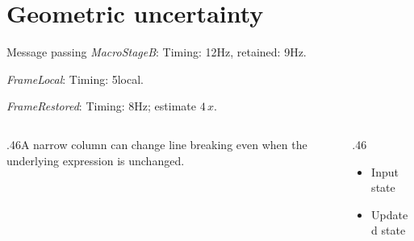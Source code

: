 \documentclass[11pt,aspectratio=43]{beamer}
\newcommand{\fuzzlayerA}[1]{\textit{#1}}
\newcommand{\fuzzlayerB}[1]{\fuzzlayerA{#1}}
\newcommand{\fuzzterm}[1]{\fuzzlayerB{#1}}
\newcommand{\fuzzpair}[2]{\fuzzterm{#1}: #2}
\newcommand{\fuzzunit}{Hz}
\let\fuzzoriginalunit\fuzzunit
\newcommand{\fuzzcoefficient}{4}
\newcommand{\fuzzscale}[2][\fuzzcoefficient]{#1\,#2}
\begin{document}
\section{Geometric uncertainty}
\begin{frame}[t]{Message passing}
\fuzzpair{MacroStageB}{Timing: 12\fuzzunit, retained: 9\fuzzoriginalunit.}\par
{\renewcommand{\fuzzunit}{local}\fuzzpair{FrameLocal}{Timing: 5\fuzzunit.}\par}
\fuzzpair{FrameRestored}{Timing: 8\fuzzunit; estimate $\fuzzscale{x}$.}\par
\begin{columns}[T]\begin{column}{.46\textwidth}A narrow column can change line breaking even when the underlying expression is unchanged.\end{column}\begin{column}{.46\textwidth}\begin{itemize}\item Input state\item Updated state\end{itemize}\end{column}\end{columns}
\end{frame}
\end{document}
